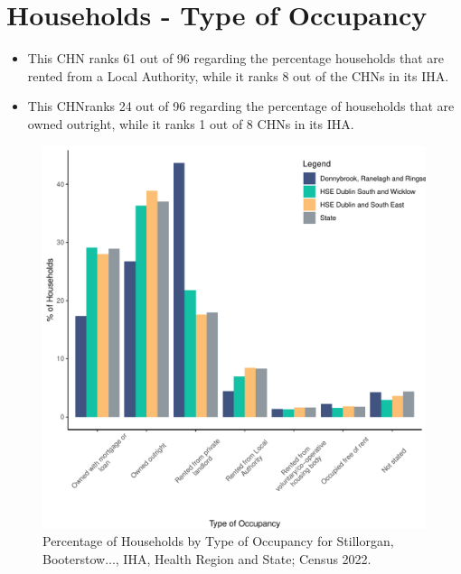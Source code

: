 \documentclass{article}
\begin{document}
\section{Households - Type of Occupancy}\label{sect:Households}
\begin{itemize}
\item This CHN ranks  61 out of 96 regarding the percentage households that are rented from a Local Authority, while it ranks  8 out of the CHNs in its IHA. 
\item This CHNranks  24 out of 96 regarding the percentage of households that are owned outright, while it ranks   1 out of 8 CHNs in its IHA.
\end{itemize}
\begin{figure}[H]
	\centering
	\includegraphics[width = 140mm]{../figures/HouseholdsED.pdf}
	\caption{Percentage of Households by Type of Occupancy for Stillorgan, Booterstow..., IHA, Health Region and State; Census 2022.}
	\label{fig:vbnv}
	\end{figure}
\end{document}
